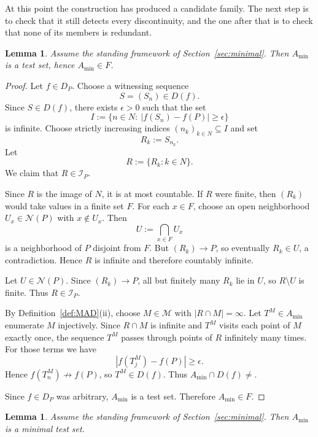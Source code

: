 \documentclass[11pt]{amsart}
\theoremstyle{plain}
\newtheorem{lemma}[theorem]{Lemma}
\theoremstyle{definition}
\theoremstyle{remark}
\newcommand{\Dp}{\mathcal{D}_P}
\newcommand{\F}{\mathcal{F}}
\newcommand{\N}{\mathbb{N}}
\newcommand{\e}{\epsilon}
\def\Dp{D_P}%
\def\F{F}%
\def\N{N}%
\def\emptyset{}%
\begin{document}
At this point the construction has produced a candidate family.
The next step is to check that it still detects every discontinuity, and the one after that is to check that none of its members is redundant.

\begin{lemma}\label{lem:Amin_is_testset}
Assume the standing framework of Section~\ref{sec:minimal}.
Then $A_{\min}$ is a test set, hence $A_{\min}\in\F$.
\end{lemma}

\begin{proof}
Let $f\in\Dp$.
Choose a witnessing sequence
\[
S=(S_n)\in D(f).
\]
Since $S\in D(f)$, there exists $\e>0$ such that the set
\[
I:=\{n\in\N:\ |f(S_n)-f(P)|\ge\e\}
\]
is infinite.
Choose strictly increasing indices $(n_k)_{k\in\N}\subseteq I$ and set
\[
R_k:=S_{n_k}.
\]
Let
\[
R:=\{R_k:k\in\N\}.
\]
We claim that $R\in\mathcal I_P$.

Since $R$ is the image of $\N$, it is at most countable.
If $R$ were finite, then $(R_k)$ would take values in a finite set $F$.
For each $x\in F$, choose an open neighborhood $U_x\in\mathcal N(P)$ with $x\notin U_x$.
Then
\[
U:=\bigcap_{x\in F}U_x
\]
is a neighborhood of $P$ disjoint from $F$.
But $(R_k)\to P$, so eventually $R_k\in U$, a contradiction.
Hence $R$ is infinite and therefore countably infinite.

Let $U\in\mathcal N(P)$.
Since $(R_k)\to P$, all but finitely many $R_k$ lie in $U$, so $R\setminus U$ is finite.
Thus $R\in\mathcal I_P$.

By Definition~\ref{def:MAD}(ii), choose $M\in\mathcal M$ with $|R\cap M|=\infty$.
Let $T^M\in A_{\min}$ enumerate $M$ injectively.
Since $R\cap M$ is infinite and $T^M$ visits each point of $M$ exactly once, the sequence $T^M$ passes through points of $R$ infinitely many times.
For those terms we have
\[
|f(T^M_j)-f(P)|\ge \e.
\]
Hence $f(T^M_n)\not\to f(P)$, so $T^M\in D(f)$.
Thus $A_{\min}\cap D(f)\neq\emptyset$.

Since $f\in\Dp$ was arbitrary, $A_{\min}$ is a test set.
Therefore $A_{\min}\in\F$.
\end{proof}

\begin{lemma}\label{lem:Amin_minimal}
Assume the standing framework of Section~\ref{sec:minimal}.
Then $A_{\min}$ is a minimal test set.
\end{lemma}
\end{document}
